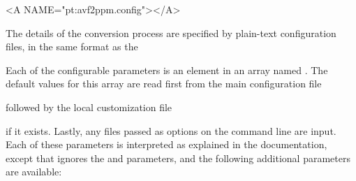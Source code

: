 \begin{rawhtml}
<A NAME="pt:avf2ppm.config"></A>
\end{rawhtml}
The details of the conversion process are specified by plain-text
configuration files, in the same format as the

Each of the configurable parameters is an element in an array named
.  The default values for this array are read first
from the main configuration file
\begin{quote}
\end{quote}
followed by the local customization file
\begin{quote}
\end{quote}
if it exists.  Lastly, any files passed as  options on the
command line are input.  Each of these parameters is interpreted as
explained in the 
documentation, except that  ignores the
 and 
parameters, and the following additional parameters are available:
